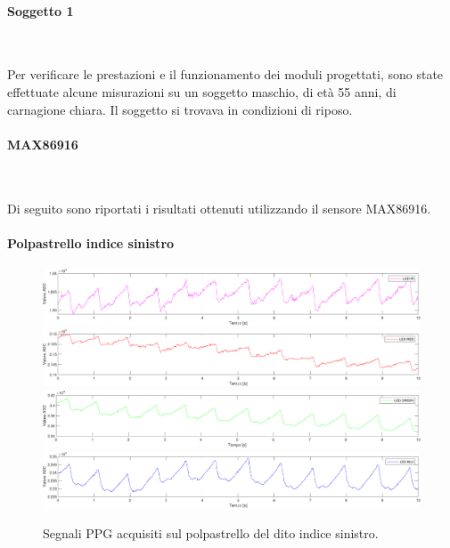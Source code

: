 \paragraph{Soggetto 1}~

Per verificare le prestazioni e il funzionamento dei moduli progettati, sono state effettuate alcune misurazioni su un soggetto maschio, di età 55 anni, di carnagione chiara. Il soggetto si trovava in condizioni di riposo.

\paragraph{MAX86916}~

Di seguito sono riportati i risultati ottenuti utilizzando il sensore MAX86916.

\paragraph{Polpastrello indice sinistro}
\begin{figure}[h]
	\centering
	\includegraphics[width=1\linewidth]{ImageFiles/Misure Preliminari/Soggetto 1/polpastrello_ired}
	\includegraphics[width=1\linewidth]{ImageFiles/Misure Preliminari/Soggetto 1/polpastrello_red}
	\includegraphics[width=1\linewidth]{ImageFiles/Misure Preliminari/Soggetto 1/polpastrello_green}
	\includegraphics[width=1\linewidth]{ImageFiles/Misure Preliminari/Soggetto 1/polpastrello_blu}
	\caption{Segnali PPG acquisiti sul polpastrello del dito indice sinistro.}
	\label{fig:soggetto1_polpastrello}
\end{figure}
